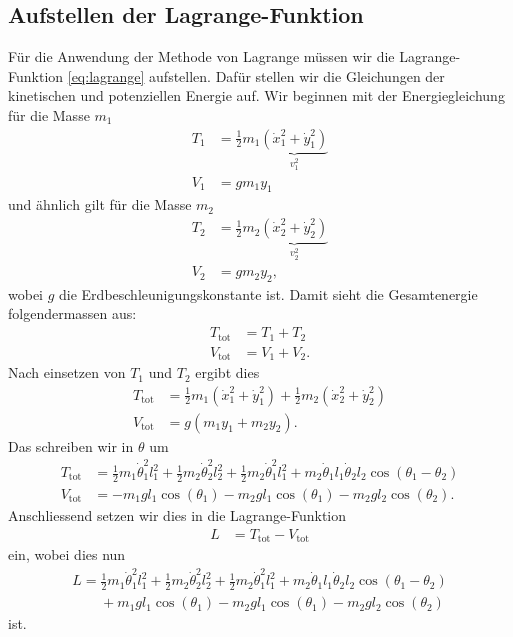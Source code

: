 \subsection{Aufstellen der Lagrange-Funktion}
Für die Anwendung der Methode von Lagrange müssen wir die Lagrange-Funktion 
\eqref{eq:lagrange} aufstellen.
Dafür stellen wir die Gleichungen der kinetischen und potenziellen Energie auf.
Wir beginnen mit der Energiegleichung für die Masse \(m_1\)
\begin{align*}
    T_1 &= \frac{1}{2} m_1 
    \underbrace{( \dot{x}_1^2 + \dot{y}_1^2 )}_{\displaystyle v_1^2}\\
    V_1 &= g m_1 y_1
\end{align*}
und ähnlich gilt für die Masse \(m_2\)
\begin{align*}
    T_2 &= \frac{1}{2} m_2 
    \underbrace{( \dot{x}_2^2 + \dot{y}_2^2 )}_{\displaystyle v_2^2}\\
    V_2 &= g m_2 y_2,
\end{align*}
wobei \(g\) die Erdbeschleunigungskonstante ist.
Damit sieht die Gesamtenergie folgendermassen aus:
\begin{align*}
    T_{\text{tot}} &= T_1 + T_2\\
    V_{\text{tot}} &= V_1 + V_2.
\end{align*}
Nach einsetzen von \(T_1\) und \(T_2\) ergibt dies
\begin{align*}
    T_{\text{tot}} &= \frac{1}{2} m_1 ( \dot{x}_1^2 + \dot{y}_1^2 ) +
    \frac{1}{2} m_2 ( \dot{x}_2^2 + \dot{y}_2^2 )\\
    V_{\text{tot}} &= g ( m_1 y_1 + m_2 y_2 ).
\end{align*}
Das schreiben wir in \(\theta\) um
\begin{align*}
    T_{\text{tot}} &= \frac{1}{2} m_1 \dot{\theta}^2_1 l_1^2 + 
    \frac{1}{2} m_2 \dot{\theta}^2_2 l_2^2 + \frac{1}{2}
    m_2 \dot{\theta}^2_1 l_1^2 + 
    m_2 \dot{\theta}_1 l_1 \dot{\theta}_2 l_2 
    \cos(\theta_1 - \theta_2)\\
    V_{\text{tot}} &= -m_1 g l_1 \cos(\theta_1) -
    m_2 g l_1 \cos(\theta_1) -
    m_2 g l_2 \cos(\theta_2).
\end{align*}
Anschliessend setzen wir dies in die Lagrange-Funktion
\begin{align*}
    L &= T_{\text{tot}} - V_{\text{tot}}
\end{align*}
ein, wobei dies nun
\begin{align*}
    L = \frac{1}{2} m_1 \dot{\theta}^2_1 l_1^2 + 
    \frac{1}{2} m_2 \dot{\theta}^2_2 l_2^2 + \frac{1}{2}
    m_2 \dot{\theta}^2_1 l_1^2 + 
    m_2 \dot{\theta}_1 l_1 \dot{\theta}_2 l_2 
    \cos(\theta_1 - \theta_2)\\ \nonumber
    \qquad + m_1 g l_1 \cos(\theta_1) -
    m_2 g l_1 \cos(\theta_1) -
    m_2 g l_2 \cos(\theta_2)
\end{align*}
ist.

